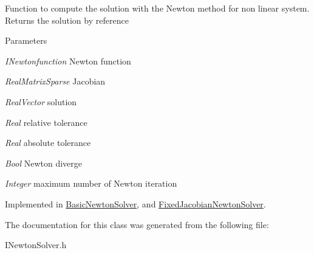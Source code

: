 Function to compute the solution with the Newton method for non linear system. Returns the solution by reference 
\begin{DoxyParams}{Parameters}
\item[{\em INewtonfunction}]Newton function \item[{\em RealMatrixSparse}]Jacobian \item[{\em RealVector}]solution \item[{\em Real}]relative tolerance \item[{\em Real}]absolute tolerance \item[{\em Bool}]Newton diverge \item[{\em Integer}]maximum number of Newton iteration \end{DoxyParams}


Implemented in \hyperlink{classBasicNewtonSolver_a24d27f55e338412dbd6337087a25190a}{BasicNewtonSolver}, and \hyperlink{classFixedJacobianNewtonSolver_a0afd96a1a9a1622f27cbe7b3fa345d01}{FixedJacobianNewtonSolver}.

The documentation for this class was generated from the following file:\begin{DoxyCompactItemize}
\item 
INewtonSolver.h\end{DoxyCompactItemize}
